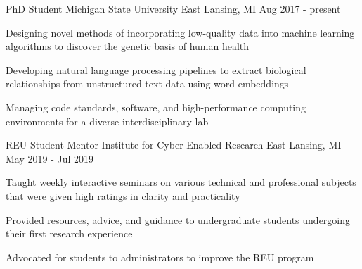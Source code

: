 

\begin{cventries}

  \cventry
    {PhD Student} %
    {Michigan State University} %
    {East Lansing, MI} %
    {Aug 2017 - present} %
    {
      \begin{cvitems} %
        \item {Designing novel methods of incorporating low-quality data into machine learning algorithms to discover the genetic basis of human health}
        \item {Developing natural language processing pipelines to extract biological relationships from unstructured text data using word embeddings}
        \item {Managing code standards, software, and high-performance computing environments for a diverse interdisciplinary lab}
      \end{cvitems}
    }

  \cventry
    {REU Student Mentor} %
    {Institute for Cyber-Enabled Research} %
    {East Lansing, MI} %
    {May 2019 - Jul 2019} %
    {
      \begin{cvitems} %
        \item {Taught weekly interactive seminars on various technical and professional subjects that were given high ratings in clarity and practicality}
        \item {Provided resources, advice, and guidance to undergraduate students undergoing their first research experience}
        \item {Advocated for students to administrators to improve the REU program}
      \end{cvitems}
    }


\end{cventries}
